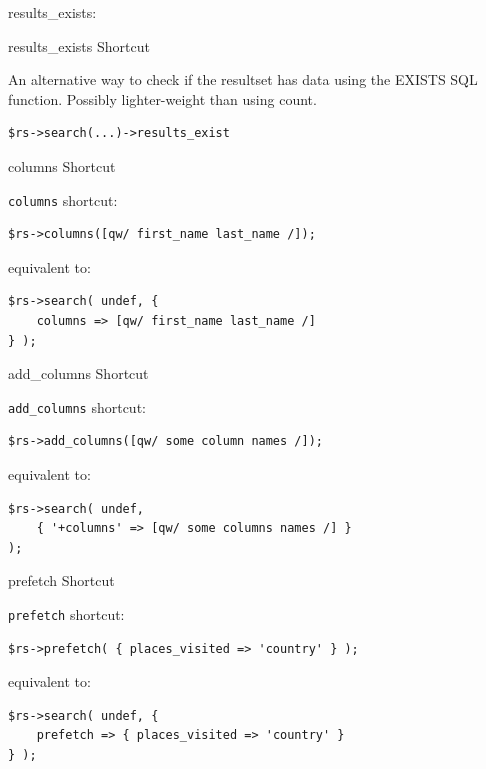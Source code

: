 results\_exists:

\begin{frame}[fragile]{results\_exists Shortcut}

An alternative way to check if the resultset has data using the EXISTS SQL function. Possibly lighter-weight than using count.

\begin{lstlisting}
$rs->search(...)->results_exist
\end{lstlisting}
\end{frame}

\begin{frame}[fragile]{columns Shortcut}

\verb|columns| shortcut:

\begin{lstlisting}
$rs->columns([qw/ first_name last_name /]);
\end{lstlisting}

equivalent to:

\begin{lstlisting}
$rs->search( undef, { 
    columns => [qw/ first_name last_name /] 
} );
\end{lstlisting}

\end{frame}

\begin{frame}[fragile]{add\_columns Shortcut}

\verb|add_columns| shortcut:

\begin{lstlisting}
$rs->add_columns([qw/ some column names /]);
\end{lstlisting}

equivalent to:

\begin{lstlisting}
$rs->search( undef,
    { '+columns' => [qw/ some columns names /] }
);
\end{lstlisting}
\end{frame}

\begin{frame}[fragile]{prefetch Shortcut}

\verb|prefetch| shortcut:

\begin{lstlisting}
$rs->prefetch( { places_visited => 'country' } );
\end{lstlisting}

equivalent to:

\begin{lstlisting}
$rs->search( undef, { 
    prefetch => { places_visited => 'country' } 
} );
\end{lstlisting}

\end{frame}


